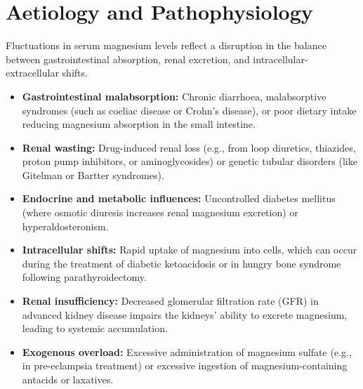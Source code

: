 \section*{Aetiology and Pathophysiology}
Fluctuations in serum magnesium levels reflect a disruption in the balance between gastrointestinal absorption, renal excretion, and intracellular-extracellular shifts.
\begin{itemize}
    \item \textbf{Gastrointestinal malabsorption:} Chronic diarrhoea, malabsorptive syndromes (such as coeliac disease or Crohn's disease), or poor dietary intake reducing magnesium absorption in the small intestine.
    \item \textbf{Renal wasting:} Drug-induced renal loss (e.g., from loop diuretics, thiazides, proton pump inhibitors, or aminoglycosides) or genetic tubular disorders (like Gitelman or Bartter syndromes).
    \item \textbf{Endocrine and metabolic influences:} Uncontrolled diabetes mellitus (where osmotic diuresis increases renal magnesium excretion) or hyperaldosteronism.
    \item \textbf{Intracellular shifts:} Rapid uptake of magnesium into cells, which can occur during the treatment of diabetic ketoacidosis or in hungry bone syndrome following parathyroidectomy.
    \item \textbf{Renal insufficiency:} Decreased glomerular filtration rate (GFR) in advanced kidney disease impairs the kidneys' ability to excrete magnesium, leading to systemic accumulation.
    \item \textbf{Exogenous overload:} Excessive administration of magnesium sulfate (e.g., in pre-eclampsia treatment) or excessive ingestion of magnesium-containing antacids or laxatives.
\end{itemize}

